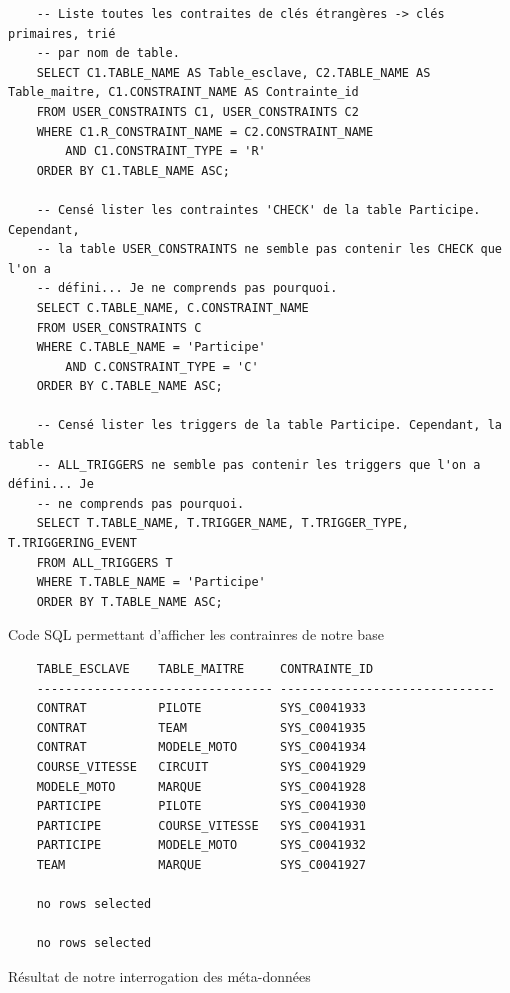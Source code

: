 \documentclass[12pt,a4paper]{article}
\newenvironment{code}{\captionsetup{type=listing}}{}
\begin{document}
\begin{code}
    \begin{verbatim}
    -- Liste toutes les contraites de clés étrangères -> clés primaires, trié
    -- par nom de table.
    SELECT C1.TABLE_NAME AS Table_esclave, C2.TABLE_NAME AS Table_maitre, C1.CONSTRAINT_NAME AS Contrainte_id
    FROM USER_CONSTRAINTS C1, USER_CONSTRAINTS C2
    WHERE C1.R_CONSTRAINT_NAME = C2.CONSTRAINT_NAME
        AND C1.CONSTRAINT_TYPE = 'R'
    ORDER BY C1.TABLE_NAME ASC;

    -- Censé lister les contraintes 'CHECK' de la table Participe. Cependant,
    -- la table USER_CONSTRAINTS ne semble pas contenir les CHECK que l'on a
    -- défini... Je ne comprends pas pourquoi.
    SELECT C.TABLE_NAME, C.CONSTRAINT_NAME
    FROM USER_CONSTRAINTS C
    WHERE C.TABLE_NAME = 'Participe'
        AND C.CONSTRAINT_TYPE = 'C'
    ORDER BY C.TABLE_NAME ASC;

    -- Censé lister les triggers de la table Participe. Cependant, la table
    -- ALL_TRIGGERS ne semble pas contenir les triggers que l'on a défini... Je
    -- ne comprends pas pourquoi.
    SELECT T.TABLE_NAME, T.TRIGGER_NAME, T.TRIGGER_TYPE, T.TRIGGERING_EVENT
    FROM ALL_TRIGGERS T
    WHERE T.TABLE_NAME = 'Participe'
    ORDER BY T.TABLE_NAME ASC;
    \end{verbatim}
    \caption{Code SQL permettant d'afficher les contrainres de notre base}
    \label{lst.metadata}
\end{code}

\begin{code}
    \begin{verbatim}
    TABLE_ESCLAVE    TABLE_MAITRE     CONTRAINTE_ID
    --------------------------------- ------------------------------
    CONTRAT          PILOTE           SYS_C0041933
    CONTRAT          TEAM             SYS_C0041935
    CONTRAT          MODELE_MOTO      SYS_C0041934
    COURSE_VITESSE   CIRCUIT          SYS_C0041929
    MODELE_MOTO      MARQUE           SYS_C0041928
    PARTICIPE        PILOTE           SYS_C0041930
    PARTICIPE        COURSE_VITESSE   SYS_C0041931
    PARTICIPE        MODELE_MOTO      SYS_C0041932
    TEAM             MARQUE           SYS_C0041927

    no rows selected

    no rows selected
    \end{verbatim}
    \caption{Résultat de notre interrogation des méta-données}
    \label{lst.metadata.res}
\end{code}
\end{document}
